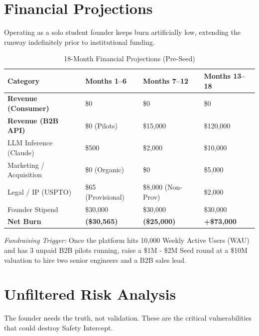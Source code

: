 \documentclass[12pt, letterpaper]{article}
\begin{document}
\newpage
\section{Financial Projections}

Operating as a solo student founder keeps burn artificially low, extending the runway indefinitely prior to institutional funding.

\begin{table}[H]
\centering
\caption{18-Month Financial Projections (Pre-Seed)}
\begin{tabularx}{\textwidth}{@{} l X X X @{}}
\toprule
\textbf{Category} & \textbf{Months 1--6} & \textbf{Months 7--12} & \textbf{Months 13--18} \\
\midrule
\textbf{Revenue (Consumer)} & \$0 & \$0 & \$0 \\
\textbf{Revenue (B2B API)} & \$0 (Pilots) & \$15,000 & \$120,000 \\
\midrule
LLM Inference (Claude) & \$500 & \$2,000 & \$10,000 \\
Marketing / Acquisition & \$0 (Organic) & \$0 & \$5,000 \\
Legal / IP (USPTO) & \$65 (Provisional) & \$8,000 (Non-Prov) & \$2,000 \\
Founder Stipend & \$30,000 & \$30,000 & \$30,000 \\
\midrule
\textbf{Net Burn} & \textbf{(\$30,565)} & \textbf{(\$25,000)} & \textbf{+\$73,000} \\
\bottomrule
\end{tabularx}
\end{table}

\textit{Fundraising Trigger:} Once the platform hits 10,000 Weekly Active Users (WAU) and has 3 unpaid B2B pilots running, raise a \$1M - \$2M Seed round at a \$10M valuation to hire two senior engineers and a B2B sales lead.

\newpage
\section{Unfiltered Risk Analysis}

The founder needs the truth, not validation. These are the critical vulnerabilities that could destroy Safety Intercept.
\end{document}
